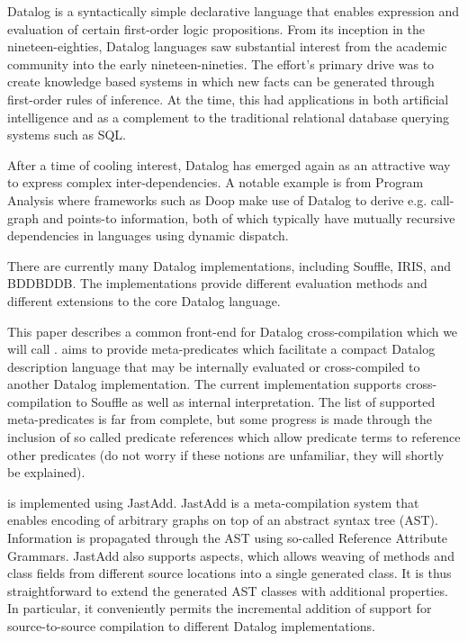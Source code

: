 Datalog is a syntactically simple declarative language that enables expression and evaluation of certain first-order logic propositions. From its inception in the nineteen-eighties, Datalog languages saw substantial interest from the academic community into the early nineteen-nineties\cite{Green:2013:DRQ:2688167.2688168}. The effort's primary drive was to create knowledge based systems in which new facts can be generated through first-order rules of inference. At the time, this had applications in both artificial intelligence and as a complement to the traditional relational database querying systems such as SQL\cite{Ceri:1989:YAW:627272.627357}\cite{Bancilhon:1986:AIR:16894.16859}.

After a time of cooling interest, Datalog has emerged again as an attractive way to express complex inter-dependencies\cite{Green:2013:DRQ:2688167.2688168}. A notable example is from Program Analysis where frameworks such as Doop\cite{Smaragdakis:2010:UDF:2185923.2185939} make use of Datalog to derive e.g. call-graph and points-to information, both of which typically have mutually recursive dependencies in languages using dynamic dispatch. 

There are currently many Datalog implementations, including Souffle\cite{Scholz:2016:FLP:2892208.2892226}, IRIS\cite{Bishop_iris-integrated}, and BDDBDDB\cite{Whaley:2005:UDB:2099708.2099719}. The implementations provide different evaluation methods and different extensions to the core Datalog language. 

This paper describes a common front-end for Datalog cross-compilation which we will call \datalogM. \datalogM aims to provide meta-predicates which facilitate a compact Datalog description language that may be internally evaluated or cross-compiled to another Datalog implementation. The current implementation supports cross-compilation to Souffle as well as internal interpretation. The list of supported meta-predicates is far from complete, but some progress is made through the inclusion of so called predicate references which allow predicate terms to reference other predicates (do not worry if these notions are unfamiliar, they will shortly be explained).

\datalogM is implemented using JastAdd\cite{Ekman:2007:JEJ:1297105.1297029}. JastAdd is a meta-compilation system that enables encoding of arbitrary graphs on top of an abstract syntax tree (AST). Information is propagated through the AST using so-called Reference Attribute Grammars\cite{Ekman:2007:JEJ:1297105.1297029}. JastAdd also supports aspects, which allows weaving of methods and class fields from different source locations into a single generated class. It is thus straightforward to extend the generated AST classes with additional properties. In particular, it conveniently permits the incremental addition of support for source-to-source compilation to different Datalog implementations. 

